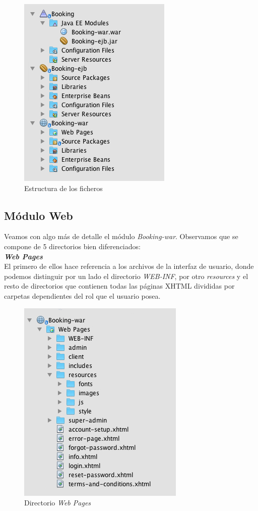 \begin{figure}
\centering
  \includegraphics[scale=.65]{img/ficheros/estructura-ficheros.jpg}
  \caption{Estructura de los ficheros}
  \label{fig:estructura-ficheros}
\end{figure}


\subsection{Módulo Web}

Veamos con algo más de detalle el módulo \textit{Booking-war}. Observamos que se compone de 5 directorios bien diferenciados:
\\

\textit{\textbf{Web Pages}}
\\

El primero de ellos hace referencia a los archivos de la interfaz de usuario, donde podemos distinguir por un lado el directorio \textit{WEB-INF}, por otro \textit{resources} y el resto de directorios que contienen todas las páginas XHTML divididas por carpetas dependientes del rol que el usuario posea. 

\begin{figure}
\centering
  \includegraphics[scale=.60]{img/ficheros/web-pages.jpg}
  \caption{Directorio \textit{Web Pages}}
  \label{fig:ficheros-pages}
\end{figure}


